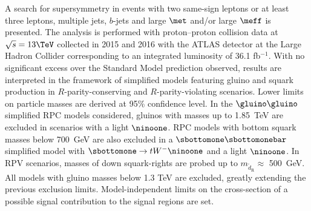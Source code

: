 A search for supersymmetry in events with two same-sign leptons or at least three leptons, multiple jets, 
$b$-jets and large $\met$ and/or large $\meff$ is presented. 
The analysis is performed with proton--proton collision data at $\sqrt{s}=13\TeV$ 
collected in 2015 and 2016 with the ATLAS detector at the Large Hadron Collider 
corresponding to an integrated luminosity of 36.1 fb$^{-1}$. 
With no significant excess over the Standard Model prediction observed,
results are interpreted in the framework of simplified models featuring gluino 
and squark production in $R$-parity-conserving and $R$-parity-violating scenarios. Lower limits on particle 
masses are derived at 95\% confidence level. 
In the $\gluino\gluino$ simplified RPC models considered, gluinos with masses up to 1.85~TeV
are excluded in scenarios with a light $\ninoone$. RPC models with bottom squark masses below 700~GeV
are also excluded in a $\sbottomone\sbottomonebar$ simplified model with $\sbottomone\to tW^-\ninoone$ and a light $\ninoone$. 
In RPV scenarios, masses of down squark-rights are probed up to $m_{\tilde d_\mathrm{R}}\approx$ 500~GeV. 
All models with gluino masses below 1.3 TeV are excluded, greatly extending the previous exclusion limits.
Model-independent limits on the cross-section of a possible signal contribution to the signal regions are set.
